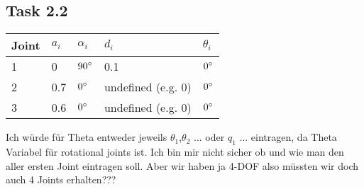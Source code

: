 \subsection*{Task 2.2}
\begin{center}
	\begin{tabular}{ | l | l | l | l | l |}
		\hline
		Joint & $a_{i}$ & $\alpha_{i}$ & $d_i$ & $\theta_i$ \\ \hline
		1 & 0 & $90\degree$ & 0.1 & $0\degree$\\ \hline
		2 & 0.7 & $0\degree$ & undefined (e.g. 0) & $0\degree$\\ \hline
		3 & 0.6 & $0\degree$ & undefined (e.g. 0) & $0\degree$\\ \hline
	\end{tabular}
\end{center}
Ich würde für Theta entweder jeweils $\theta_1$,$\theta_2$ ... oder $q_1$ ...
eintragen, da Theta Variabel für rotational joints ist. Ich bin mir nicht sicher ob und wie man den aller ersten Joint eintragen soll. Aber wir haben ja 4-DOF also müssten wir doch auch 4 Joints erhalten???